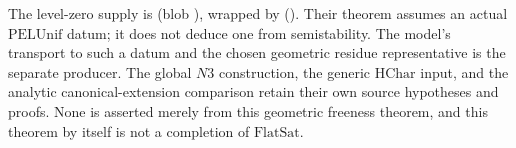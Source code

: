 The level-zero supply is
\href{https://github.com/ChristianKudeba/alpoge-rh-verification/blob/alpoge-source-7cbf7a0c/src/Development/WeilBound/CoreStatements/HodgeTatePoints/CgUnif.lean}
{}
(blob ),
wrapped by
\href{https://github.com/ChristianKudeba/alpoge-rh-verification/blob/alpoge-source-7cbf7a0c/src/Development/AutomorphicSpectrum/Proofs/GeometryProofs/PelUniformisedGeometricFree.lean}
{}
().
Their theorem assumes an actual \(\mathrm{PELUnif}\) datum;
it does not deduce one from semistability.
The model's transport to such a datum and the chosen geometric
residue representative is the separate
 producer.
The global \(N3\) construction, the generic
\(\mathrm{HChar}\) input, and the analytic canonical-extension
comparison retain their own source hypotheses and proofs.
None is asserted merely from this geometric freeness theorem,
and this theorem by itself is not a completion of
\(\mathrm{FlatSat}\).
